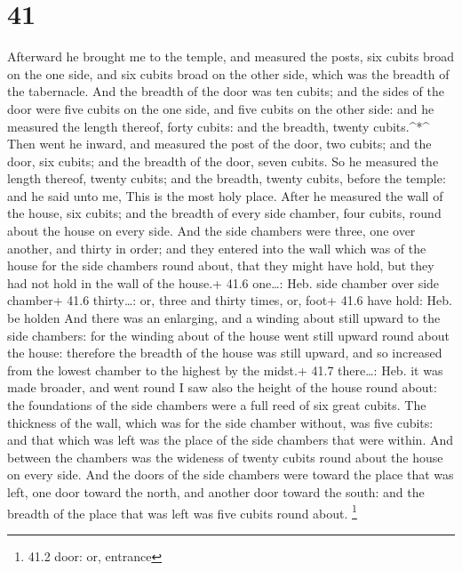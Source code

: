 \hypertarget{section-40}{%
\section{41}\label{section-40}}

 Afterward he brought me to the temple, and measured the
posts, six cubits broad on the one side, and six cubits broad on the
other side, which was the breadth of the tabernacle.  And
the breadth of the door was ten cubits; and the sides of the door were
five cubits on the one side, and five cubits on the other side: and he
measured the length thereof, forty cubits: and the breadth, twenty
cubits.\^{}*\^{}  Then went he inward, and measured the post
of the door, two cubits; and the door, six cubits; and the breadth of
the door, seven cubits.  So he measured the length thereof,
twenty cubits; and the breadth, twenty cubits, before the temple: and he
said unto me, This is the most holy place.  After he
measured the wall of the house, six cubits; and the breadth of every
side chamber, four cubits, round about the house on every side.
 And the side chambers were three, one over another, and
thirty in order; and they entered into the wall which was of the house
for the side chambers round about, that they might have hold, but they
had not hold in the wall of the house.+ 41.6 one\ldots: Heb. side
chamber over side chamber+ 41.6 thirty\ldots: or, three and thirty
times, or, foot+ 41.6 have hold: Heb. be holden  And there
was an enlarging, and a winding about still upward to the side chambers:
for the winding about of the house went still upward round about the
house: therefore the breadth of the house was still upward, and so
increased from the lowest chamber to the highest by the midst.+ 41.7
there\ldots: Heb. it was made broader, and went round  I saw
also the height of the house round about: the foundations of the side
chambers were a full reed of six great cubits.  The
thickness of the wall, which was for the side chamber without, was five
cubits: and that which was left was the place of the side chambers that
were within.  And between the chambers was the wideness of
twenty cubits round about the house on every side.  And the
doors of the side chambers were toward the place that was left, one door
toward the north, and another door toward the south: and the breadth of
the place that was left was five cubits round about. \footnote{41.2
  door: or, entrance}

